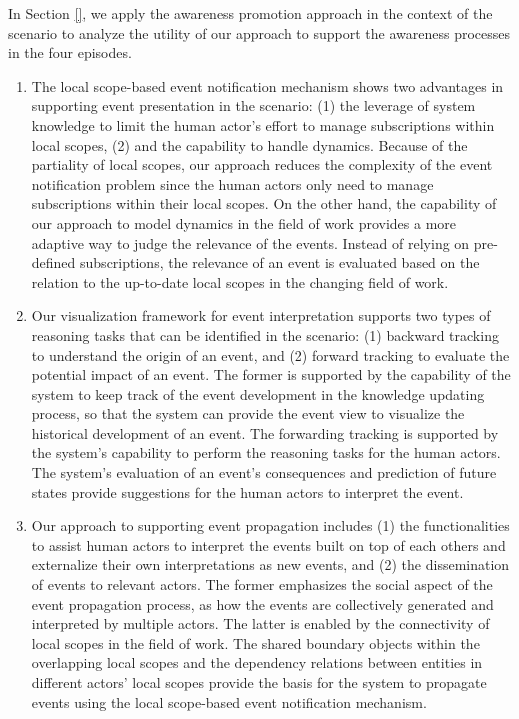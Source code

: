 In Section \ref{}, we apply the awareness promotion approach in the context of the scenario to analyze the utility of our approach to support the awareness processes in the four episodes. 
\begin{enumerate}
	\item The local scope-based event notification mechanism shows two advantages in supporting event presentation in the scenario: (1) the leverage of system knowledge to limit the human actor’s effort to manage subscriptions within local scopes, (2) and the capability to handle dynamics. Because of the partiality of local scopes, our approach reduces the complexity of the event notification problem since the human actors only need to manage subscriptions within their local scopes. On the other hand, the capability of our approach to model dynamics in the field of work provides a more adaptive way to judge the relevance of the events. Instead of relying on pre-defined subscriptions, the relevance of an event is evaluated based on the relation to the up-to-date local scopes in the changing field of work.
	\item Our visualization framework for event interpretation supports two types of reasoning tasks that can be identified in the scenario: (1) backward tracking to understand the origin of an event, and (2) forward tracking to evaluate the potential impact of an event. The former is supported by the capability of the system to keep track of the event development in the knowledge updating process, so that the system can provide the event view to visualize the historical development of an event. The forwarding tracking is supported by the system’s capability to perform the reasoning tasks for the human actors. The system's evaluation of an event's consequences and prediction of future states provide suggestions for the human actors to interpret the event. 
	\item Our approach to supporting event propagation includes (1) the functionalities to assist human actors to interpret the events built on top of each others and externalize their own interpretations as new events, and (2) the dissemination of events to relevant actors. The former emphasizes the social aspect of the event propagation process, as how the events are collectively generated and interpreted by multiple actors. The latter is enabled by the connectivity of local scopes in the field of work. The shared boundary objects within the overlapping local scopes and the dependency relations between entities in different actors' local scopes provide the basis for the system to propagate events using the local scope-based event notification mechanism.
\end{enumerate}





 

